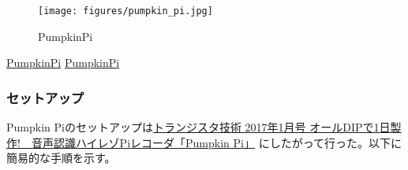 \begin{figure}
\centering
\texttt{[image: figures/pumpkin\_pi.jpg]}
\caption{PumpkinPi}
\end{figure}

\href{http://select.marutsu.co.jp/list/detail.php?id=258}{PumpkinPi}
\href{https://www.marutsu.co.jp/pc/i/833515/}{PumpkinPi}

\hypertarget{ux30bbux30c3ux30c8ux30a2ux30c3ux30d7}{%
\subsubsection{セットアップ}\label{ux30bbux30c3ux30c8ux30a2ux30c3ux30d7}}

Pumpkin
Piのセットアップは\href{https://toragi.cqpub.co.jp/tabid/829/Default.aspx}{トランジスタ技術
2017年1月号 オールDIPで1日製作!　音声認識ハイレゾPiレコーダ「Pumpkin
Pi」} にしたがって行った。以下に簡易的な手順を示す。

